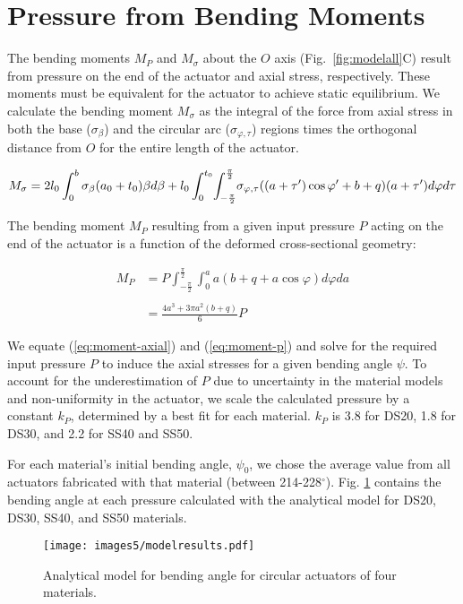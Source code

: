 \clearpage
\section{Pressure from Bending Moments}

The bending moments $M_P$ and $M_\sigma$ about the \(O\) axis (Fig.~\ref{fig:modelall}C) result from pressure on the end of the actuator and axial stress, respectively. These moments must be equivalent for the actuator to achieve static equilibrium. We calculate the bending moment $M_\sigma$ as the integral of the force from axial stress in both the base ($\sigma_{\beta}$) and the circular arc ($\sigma_{\varphi, \tau}$) regions times the orthogonal distance from \(O\) for the entire length of the actuator. 

\begin{equation}
    M_{\sigma} = 2l_{0} \int_{0}^{b} \sigma_{\beta} (a_0+t_0) \beta  d\beta
    + l_{0}\int_{0}^{t_0}\hspace{-2px}\int_{-\frac{\pi}{2}}^{\frac{\pi}{2}}\hspace{-2px}\sigma_{\varphi,\tau}((a+\tau')\cos{\varphi'}+b+q)(a+\tau') d\varphi d\tau
    \label{eq:moment-axial}
\end{equation}

The bending moment $M_P$ resulting from a given input pressure \(P\) acting on the end of the actuator is a function of the deformed cross-sectional geometry: 

\begin{align}
    M_P & = P \int_{-\frac{\pi}{2}}^{\frac{\pi}{2}}\int_0^{a} a(b+q+a\cos{\varphi})d\varphi da \\ \nonumber \\
    & = \frac{4 a^{3} + 3 \pi a^{2} (b+q)}{6} P 
    \label{eq:moment-p}
\end{align}

We equate (\ref{eq:moment-axial}) and (\ref{eq:moment-p}) and solve for the required input pressure $P$ to induce the axial stresses for a given bending angle $\psi$. To account for the underestimation of $P$ due to uncertainty in the material models and non-uniformity in the actuator, we scale the calculated pressure by a constant $k_P$, determined by a best fit for each material. $k_P$ is 3.8 for DS20, 1.8 for DS30, and 2.2 for SS40 and SS50. 

\clearpage
For each material's initial bending angle, $\psi_0$, we chose the average value from all actuators fabricated with that material (between 214-228$^\circ$). Fig. \ref{fig:modelresults} contains the bending angle at each pressure calculated with the analytical model for DS20, DS30, SS40, and SS50 materials. 

\begin{figure}[!ht]
    \centering
    \texttt{[image: images5/modelresults.pdf]}
    \caption{Analytical model for bending angle for circular actuators of four materials.}
    \label{fig:modelresults}
\end{figure}